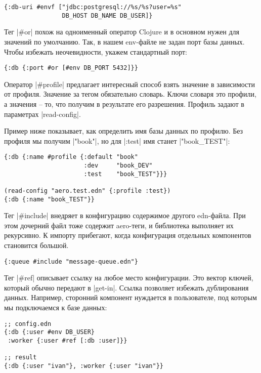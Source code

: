 \begin{verbatim}
{:db-uri #envf ["jdbc:postgresql://%s/%s?user=%s"
                DB_HOST DB_NAME DB_USER]}
\end{verbatim}

Тег \spverb|#or| похож на одноименный оператор Clojure и в основном нужен для значений
по умолчанию. Так, в нашем env-файле не задан порт базы данных. Чтобы избежать
неочевидности, укажем стандартный порт:

\begin{verbatim}
{:db {:port #or [#env DB_PORT 5432]}}
\end{verbatim}

Оператор \spverb|#profile| предлагает интересный способ взять значение в зависимости от
профиля. Значение за тегом обязательно словарь. Ключи словаря это профили, а
значения -- то, что получим в результате его разрешения. Профиль задают в
параметрах \spverb|read-config|.

Пример ниже показывает, как определить имя базы данных по профилю. Без профиля
мы получим \spverb|"book"|, но для \spverb|:test| имя станет \spverb|"book_TEST"|:

\begin{verbatim}
{:db {:name #profile {:default "book"
                      :dev     "book_DEV"
                      :test    "book_TEST"}}}

(read-config "aero.test.edn" {:profile :test})
{:db {:name "book_TEST"}}
\end{verbatim}

Тег \spverb|#include| внедряет в конфигурацию содержимое другого edn-файла. При этом
дочерний файл тоже содержит aero-теги, и библиотека выполняет их рекурсивно. К
импорту прибегают, когда конфигурация отдельных компонентов становится большой.

\begin{verbatim}
{:queue #include "message-queue.edn"}
\end{verbatim}

Тег \spverb|#ref| описывает ссылку на любое место конфигурации. Это вектор ключей,
который обычно передают в \spverb|get-in|. Ссылка позволяет избежать дублирования
данных. Например, сторонний компонент нуждается в пользователе, под которым мы
подключаемся к базе данных:

\begin{verbatim}
;; config.edn
{:db {:user #env DB_USER}
 :worker {:user #ref [:db :user]}}

;; result
{:db {:user "ivan"}, :worker {:user "ivan"}}
\end{verbatim}

